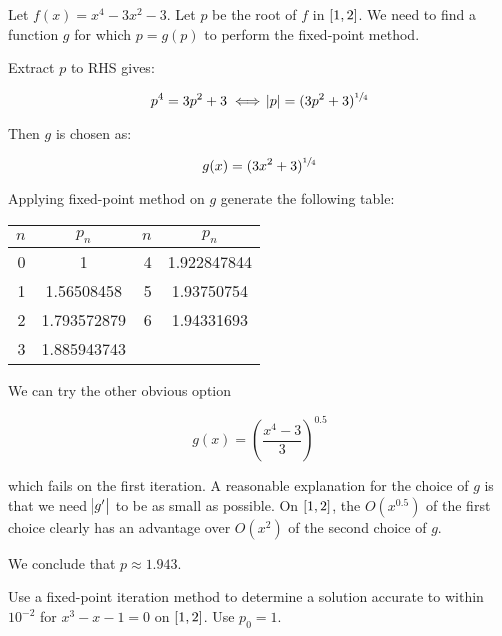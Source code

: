 \documentclass[../../../../Assignments]{subfiles}
\begin{document}
\begin{solution}
    Let \(f(x) = x^4 - 3x^2 - 3\). Let \(p\) be the root of \(f\) in
    \(\interval{1}{2}\). We need to find a function \(g\) for which \(p = g(p)\)
    to perform the fixed-point method.

    Extract \(p\) to RHS gives:

    \[p^4 = 3p^2 + 3 \iff \abs{p} = (3p^2 + 3)^{\sfrac{1}{4}}\]

    Then \(g\) is chosen as:

    \[g(x) = (3x^2 + 3)^{\sfrac{1}{4}}\]

    Applying fixed-point method on \(g\) generate the following table:

    \begin{table}[H]
        \centering
        \begin{tabular}{r S[table-format=1.9] r S[table-format=1.9]}
            \toprule
            \(n\)  &   {\(p_n\)}   &  \(n\)  &   {\(p_n\)}   \\
              &  1            &      4  &  1.922847844  \\
                1  &  1.56508458   &      5  &  1.93750754   \\
                2  &  1.793572879  &      6  &  1.94331693   \\
                3  &  1.885943743  &         &               \\
            \bottomrule
        \end{tabular}
    \end{table}

    We can try the other obvious option

    \[g(x) = \left(\frac{x^4 - 3}{3}\right)^{\num{0.5}}\]

    \noindent which fails on the first iteration. A reasonable explanation for
    the choice of \(g\) is that we need \(\abs{g'}\) to be as small as possible.
    On \(\interval{1}{2}\), the \(O(x^{\num{0.5}})\) of the first choice clearly
    has an advantage over \(O(x^2)\) of the second choice of \(g\).

    We conclude that \(p \approx \num{1.943}\).
\end{solution}

\begin{exercise}
    Use a fixed-point iteration method to determine a solution accurate to
    within \(10^{-2}\) for \(x^3 - x - 1 = 0\) on \(\interval{1}{2}\). Use \(p_0
    = 1\).
\end{exercise}
\end{document}
